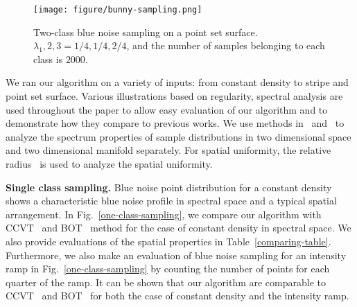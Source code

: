 \begin{figure}[htb]
  \centering
  \texttt{[image: figure/bunny-sampling.png]}
  \caption{Two-class blue noise sampling on a point set surface.
  $\lambda_1,2,3=1/4,1/4,2/4$, and the number of samples belonging to each class is $2000$.  }\label{bunny-sampling}
\end{figure}
We ran our algorithm on a variety of inputs:
from constant density to stripe and point set surface.
Various illustrations based on regularity, spectral analysis are
used throughout the paper to allow easy evaluation of our algorithm and to demonstrate how they compare to previous works.
We use methods in~\cite{schlomer:2011:accurate} and~\cite{wei:2011:differential} to analyze the
spectrum properties of sample distributions in two dimensional space and two dimensional manifold separately.
For spatial uniformity,
the relative radius~\cite{Lagae:2008:CPDD} is used to analyze the spatial uniformity.

\textbf{Single class sampling.}
Blue noise point distribution for a constant density
shows a characteristic blue noise profile in spectral space
and a typical spatial arrangement.
In Fig.~\ref{one-class-sampling},
we compare our algorithm with CCVT~\cite{balzer:2009:capacity} and BOT~\cite{de:2012:blue} method for the case of constant density in spectral space.
We also provide evaluations of the spatial properties in Table~\ref{comparing-table}.
Furthermore,
we also make an evaluation of blue noise sampling for an intensity ramp in Fig.~\ref{one-class-sampling}
by counting the number of points for each
quarter of the ramp.
It can be shown that our algorithm are comparable to CCVT~\cite{balzer:2009:capacity} and BOT~\cite{de:2012:blue} for both the case of constant density and the intensity ramp.

